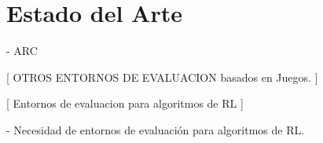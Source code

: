 \chapter{Estado del Arte}\label{chapter:state-of-the-art}

- ARC

[ OTROS ENTORNOS DE EVALUACION basados en Juegos. ]

[ Entornos de evaluacion para algoritmos de RL ]

- Necesidad de entornos de evaluación para algoritmos de RL.

